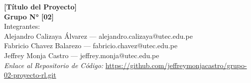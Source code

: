 \begin{center}
    {\Large \textbf{[Título del Proyecto]}} \\[0.2cm]
    \textbf{Grupo N° [02]} \\[0.1cm]
    Integrantes: \\
    Alejandro Calizaya Álvarez --- alejandro.calizaya@utec.edu.pe \\
    Fabricio Chavez Balarezo --- fabricio.chavez@utec.edu.pe \\
    Jeffrey Monja Castro --- jeffrey.monja@utec.edu.pe \\[0.2cm]
    \textit{Enlace al Repositorio de Código:} \url{https://github.com/jeffreymonjacastro/grupo-02-proyecto-rl.git}
\end{center}
